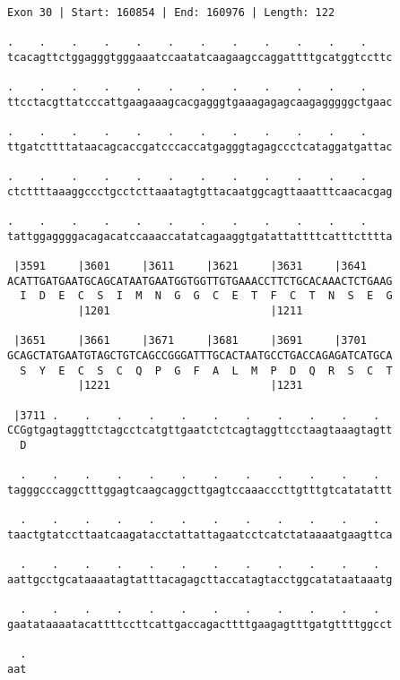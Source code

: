\documentclass{article}
\begin{document}
\begin{Verbatim}
Exon 30 | Start: 160854 | End: 160976 | Length: 122
 
.    .    .    .    .    .    .    .    .    .    .    .    
tcacagttctggagggtgggaaatccaatatcaagaagccaggattttgcatggtccttc
  
.    .    .    .    .    .    .    .    .    .    .    .    
ttcctacgttatcccattgaagaaagcacgagggtgaaagagagcaagagggggctgaac
  
.    .    .    .    .    .    .    .    .    .    .    .    
ttgatcttttataacagcaccgatcccaccatgagggtagagccctcataggatgattac
  
.    .    .    .    .    .    .    .    .    .    .    .    
ctcttttaaaggccctgcctcttaaatagtgttacaatggcagttaaatttcaacacgag
  
.    .    .    .    .    .    .    .    .    .    .    .    
tattggaggggacagacatccaaaccatatcagaaggtgatattattttcatttctttta
  
 |3591     |3601     |3611     |3621     |3631     |3641    
ACATTGATGAATGCAGCATAATGAATGGTGGTTGTGAAACCTTCTGCACAAACTCTGAAG
  I  D  E  C  S  I  M  N  G  G  C  E  T  F  C  T  N  S  E  G
           |1201                         |1211              
  
 |3651     |3661     |3671     |3681     |3691     |3701    
GCAGCTATGAATGTAGCTGTCAGCCGGGATTTGCACTAATGCCTGACCAGAGATCATGCA
  S  Y  E  C  S  C  Q  P  G  F  A  L  M  P  D  Q  R  S  C  T
           |1221                         |1231              
  
 |3711 .    .    .    .    .    .    .    .    .    .    .  
CCGgtgagtaggttctagcctcatgttgaatctctcagtaggttcctaagtaaagtagtt
  D                                                         
  
  .    .    .    .    .    .    .    .    .    .    .    .  
tagggcccaggctttggagtcaagcaggcttgagtccaaacccttgtttgtcatatattt
  
  .    .    .    .    .    .    .    .    .    .    .    .  
taactgtatccttaatcaagatacctattattagaatcctcatctataaaatgaagttca
  
  .    .    .    .    .    .    .    .    .    .    .    .  
aattgcctgcataaaatagtatttacagagcttaccatagtacctggcatataataaatg
  
  .    .    .    .    .    .    .    .    .    .    .    .  
gaatataaaatacattttccttcattgaccagacttttgaagagtttgatgttttggcct
  
  .
aat
\end{Verbatim}
\newpage
\end{document}
